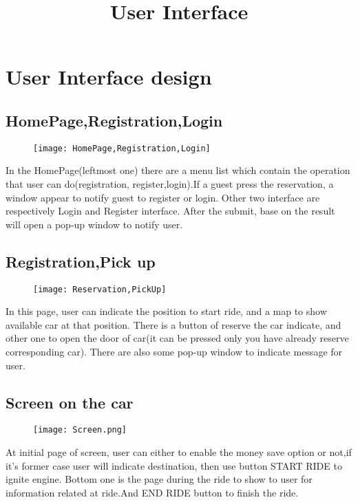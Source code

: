 \documentclass{article}
\title{User Interface}
\begin{document}
	\section{User Interface design}
		\subsection{HomePage,Registration,Login}
			\begin{figure}[!htb]
				\texttt{[image: HomePage,Registration,Login]} 
			\end{figure}
		In the HomePage(leftmost one) there are a menu list which contain the operation that user can do(registration, register,login).If a guest press the reservation, a window appear to notify guest to register or login. Other two interface are respectively Login and Register interface. After the submit, base on the result will open a pop-up window to notify user.
			\newpage
		\subsection{Registration,Pick up}
			\begin{figure}[h]
				\texttt{[image: Reservation,PickUp]} 
			\end{figure}
		In this page, user can indicate the position to start ride, and a map to show available car at that position. There is a button of reserve the car indicate, and other one to open the door of car(it can be pressed only you have already reserve corresponding car). There are also some pop-up window to indicate message for user. 
		\newpage
		\subsection{Screen on the car}
			\begin{figure}[h]
				\centering
				\texttt{[image: Screen.png]} 
			\end{figure}
			At initial page of screen, user can either to enable the money save option or not,if it's former case user will indicate destination, then use button START RIDE to ignite engine. Bottom one is the page during the ride to show to user for information related at ride.And END RIDE button to finish the ride. 
\end{document}
